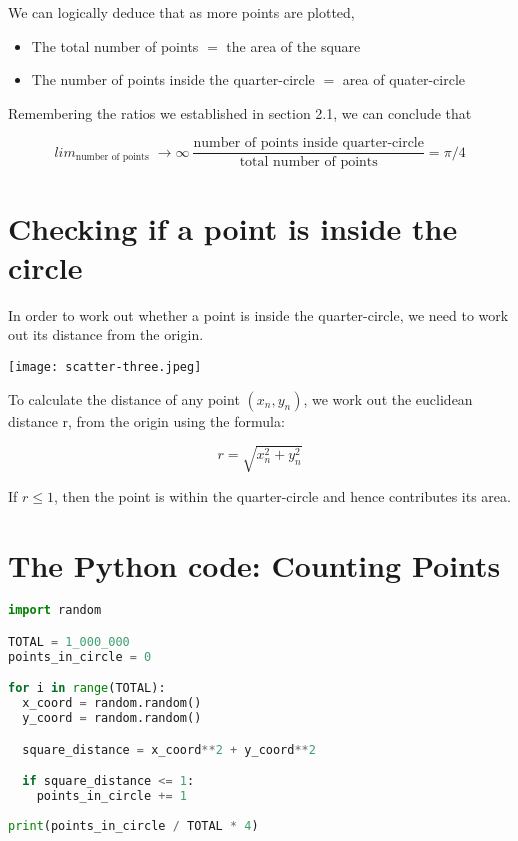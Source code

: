 \documentclass[11pt,a4paper]{amsart}
\begin{document}
We can logically deduce that as more points are plotted,

\begin{itemize}
  \item The total number of points $=$ the area of the square
  \item The number of points inside the quarter-circle $=$ area of quater-circle
\end{itemize}

\raggedright

Remembering the ratios we established in section 2.1, we can conclude that

\[ lim_{\text{number of points}}\;\rightarrow \infty\ \frac{\text{number of points inside quarter-circle}}{\text{total number of points}} = \pi / 4\]


\section{Checking if a point is inside the circle}

In order to work out whether a point is inside the quarter-circle, we need to work out its distance from the origin.

\texttt{[image: scatter-three.jpeg]}

To calculate the distance of any point $(x_{n}, y_{n})$, we work out the euclidean distance r, from the origin using the formula:

\begin{equation}
    r = \sqrt{x_{n}^2+y_{n}^2}
\end{equation}

If $r \leqslant 1$, then the point is within the quarter-circle and hence contributes its area. 

\section{The Python code: Counting Points}

\begin{lstlisting}[language=Python]
import random

TOTAL = 1_000_000 
points_in_circle = 0

for i in range(TOTAL):
  x_coord = random.random()
  y_coord = random.random()

  square_distance = x_coord**2 + y_coord**2

  if square_distance <= 1:
    points_in_circle += 1
  
print(points_in_circle / TOTAL * 4)
\end{lstlisting}
\end{document}
